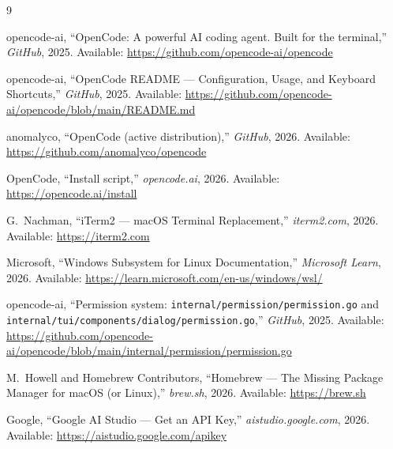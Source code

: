 \documentclass[12pt]{article}
\begin{document}

\begin{thebibliography}{9}

opencode-ai, ``OpenCode: A powerful AI coding agent. Built for the terminal,'' \emph{GitHub}, 2025. Available: \url{https://github.com/opencode-ai/opencode}

opencode-ai, ``OpenCode README --- Configuration, Usage, and Keyboard Shortcuts,'' \emph{GitHub}, 2025. Available: \url{https://github.com/opencode-ai/opencode/blob/main/README.md}

anomalyco, ``OpenCode (active distribution),'' \emph{GitHub}, 2026. Available: \url{https://github.com/anomalyco/opencode}

OpenCode, ``Install script,'' \emph{opencode.ai}, 2026. Available: \url{https://opencode.ai/install}

G.~Nachman, ``iTerm2 --- macOS Terminal Replacement,'' \emph{iterm2.com}, 2026. Available: \url{https://iterm2.com}

Microsoft, ``Windows Subsystem for Linux Documentation,'' \emph{Microsoft Learn}, 2026. Available: \url{https://learn.microsoft.com/en-us/windows/wsl/}

opencode-ai, ``Permission system: \texttt{internal/permission/permission.go} and \texttt{internal/tui/components/dialog/permission.go},'' \emph{GitHub}, 2025. Available: \url{https://github.com/opencode-ai/opencode/blob/main/internal/permission/permission.go}

M.~Howell and Homebrew Contributors, ``Homebrew --- The Missing Package Manager for macOS (or Linux),'' \emph{brew.sh}, 2026. Available: \url{https://brew.sh}

Google, ``Google AI Studio --- Get an API Key,'' \emph{aistudio.google.com}, 2026. Available: \url{https://aistudio.google.com/apikey}

\end{thebibliography}
\end{document}
